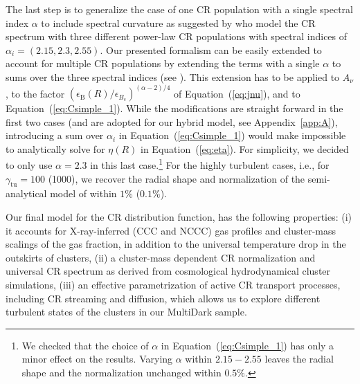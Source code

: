 \documentclass[traditabstract]{aa}
\newcommand{\rmn}{\mathrm}
\begin{document}
The last step is to generalize the case of one CR population with a single
spectral index $\alpha$ to include spectral curvature as suggested by
\cite{2010MNRAS.409..449P} who model the CR spectrum with three different
power-law CR populations with spectral indices of
$\alpha_{i}=(2.15,2.3,2.55)$. Our presented formalism can be easily extended to
account for multiple CR populations by extending the terms with a single
$\alpha$ to sums over the three spectral indices (see
\citealp{2010MNRAS.409..449P}). This extension has to be applied to $A_{\nu}$,
to the factor $(\epsilon_{\rmn{B}}(R)/ \epsilon_{B_{\rmn{c}}})^{(\alpha-2)/4}$
of Equation~(\ref{eq:jnu}), and to Equation~(\ref{eq:Csimple_1}). While the
modifications are straight forward in the first two cases (and are adopted for
our hybrid model, see Appendix~\ref{app:A}), introducing a sum over $\alpha_{i}$
in Equation~(\ref{eq:Csimple_1}) would make impossible to analytically solve for
$\eta(R)$ in Equation~(\ref{eq:eta}). For simplicity, we decided to only use
$\alpha = 2.3$ in this last case.\footnote{We checked that
  the choice of $\alpha$ in Equation~(\ref{eq:Csimple_1}) has only a minor
  effect on the results. Varying $\alpha$ within $2.15-2.55$ leaves the radial
  shape and the normalization unchanged within $0.5\%$.} For the highly
turbulent cases, i.e., for $\gamma_{\rmn{tu}}=100$ (1000), we recover the radial
shape and normalization of the semi-analytical model of
\cite{2010MNRAS.409..449P} within $1\%$ ($0.1\%$).

Our final model for the CR distribution function, has the following properties:
(i) it accounts for X-ray-inferred (CCC and NCCC) gas profiles and cluster-mass
scalings of the gas fraction, in addition to the universal temperature drop in
the outskirts of clusters, (ii) a cluster-mass dependent CR normalization and
universal CR spectrum as derived from cosmological hydrodynamical cluster
simulations, (iii) an effective parametrization of active CR transport
processes, including CR streaming and diffusion, which allows us to explore
different turbulent states of the clusters in our MultiDark sample.
\end{document}

